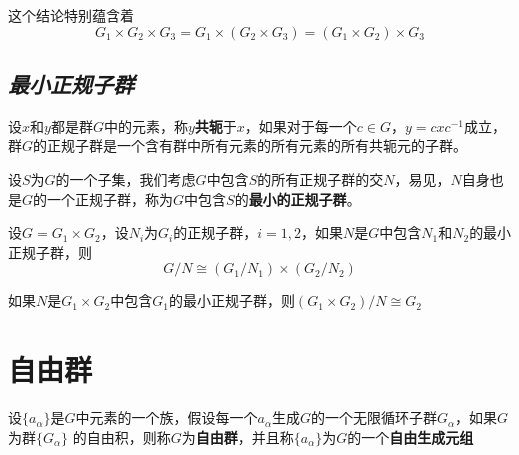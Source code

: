 这个结论特别蕴含着
\begin{equation}
    G_1\times G_2\times G_3=G_1\times (G_2\times G_3)=(G_1\times G_2)\times G_3
\end{equation}

\subsection*{\textsl{最小正规子群}}

设$x$和$y$都是群$G$中的元素，称$y$\textbf{共轭}于$x$，如果对于每一个$c\in G$，$y=cxc^{-1}$成立，群$G$的正规子群是一个含有群中所有元素的所有元素的所有共轭元的子群。

\begin{mdframed}
    \begin{define}
        设$S$为$G$的一个子集，我们考虑$G$中包含$S$的所有正规子群的交$N$，易见，$N$自身也是$G$的一个正规子群，称为$G$中包含$S$的\textbf{最小的正规子群}。
    \end{define}
\end{mdframed}

\begin{mdframed}
    \begin{theorem}
        设$G=G_1\times G_2$，设$N_i$为$G_i$的正规子群，$i=1,2$，如果$N$是$G$中包含$N_1$和$N_2$的最小正规子群，则
        \begin{equation}
            G/N\cong (G_1/N_1)\times (G_2/N_2)
        \end{equation}
    \end{theorem}
\end{mdframed}

\begin{mdframed}
    \begin{corollary}
        如果$N$是$G_1\times G_2$中包含$G_1$的最小正规子群，则$(G_1\times G_2)/N\cong G_2$
    \end{corollary}
\end{mdframed}


\section{自由群}

\begin{mdframed}
    \begin{define}
        设$\{a_\alpha\}$是$G$中元素的一个族，假设每一个$a_\alpha$生成$G$的一个无限循环子群$G_\alpha$，如果$G$为群$\{G_\alpha\}$
        的自由积，则称$G$为\textbf{自由群}，并且称$\{a_\alpha\}$为$G$的一个\textbf{自由生成元组}
    \end{define}
\end{mdframed}

